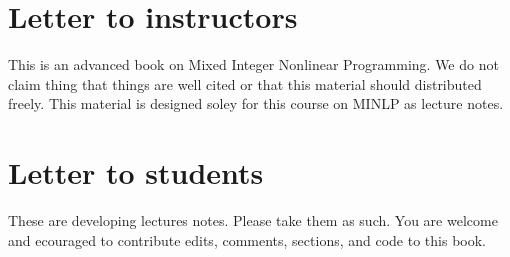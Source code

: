\section*{Letter to instructors}
This is an advanced book on Mixed Integer Nonlinear Programming.  We do not claim thing that things are well cited or that this material should distributed freely.  This material is designed soley for this course on MINLP as lecture notes.

\section*{Letter to students}

These are developing lectures notes.  Please take them as such.   You are welcome and ecouraged to contribute edits, comments, sections, and code to this book.

